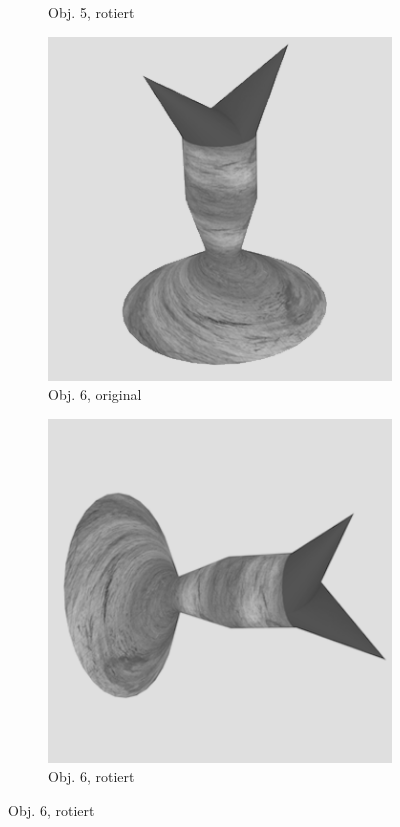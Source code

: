 \begin{figure}
\begin{subfigure}{0.2\textwidth}
\caption{Obj. 5, rotiert} \label{fig:d}
\end{subfigure} \hspace{.5cm}%
\begin{subfigure}{0.2\textwidth}
\includegraphics[width=\linewidth]{Bilder/Objekt6A.png}
\caption{Obj. 6, original} \label{fig:e}
\end{subfigure}\hspace{.5cm}
\begin{subfigure}{0.2\textwidth}
\includegraphics[width=\linewidth]{Bilder/Objekt6B.png}
\caption{Obj. 6, rotiert} \label{fig:f}
\end{subfigure}\hspace{.5cm}


\end{figure}
